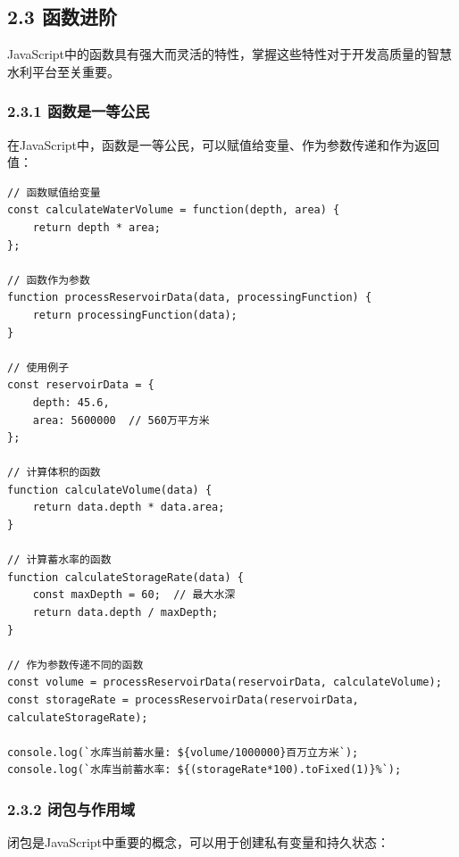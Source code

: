 \subsection{2.3 函数进阶}\label{ux51fdux6570ux8fdbux9636}

JavaScript中的函数具有强大而灵活的特性，掌握这些特性对于开发高质量的智慧水利平台至关重要。

\subsubsection{2.3.1
函数是一等公民}\label{ux51fdux6570ux662fux4e00ux7b49ux516cux6c11}

在JavaScript中，函数是一等公民，可以赋值给变量、作为参数传递和作为返回值：

\begin{lstlisting}
// 函数赋值给变量
const calculateWaterVolume = function(depth, area) {
    return depth * area;
};

// 函数作为参数
function processReservoirData(data, processingFunction) {
    return processingFunction(data);
}

// 使用例子
const reservoirData = {
    depth: 45.6,
    area: 5600000  // 560万平方米
};

// 计算体积的函数
function calculateVolume(data) {
    return data.depth * data.area;
}

// 计算蓄水率的函数
function calculateStorageRate(data) {
    const maxDepth = 60;  // 最大水深
    return data.depth / maxDepth;
}

// 作为参数传递不同的函数
const volume = processReservoirData(reservoirData, calculateVolume);
const storageRate = processReservoirData(reservoirData, calculateStorageRate);

console.log(`水库当前蓄水量: ${volume/1000000}百万立方米`);
console.log(`水库当前蓄水率: ${(storageRate*100).toFixed(1)}%`);
\end{lstlisting}

\subsubsection{2.3.2
闭包与作用域}\label{ux95edux5305ux4e0eux4f5cux7528ux57df}

闭包是JavaScript中重要的概念，可以用于创建私有变量和持久状态：

